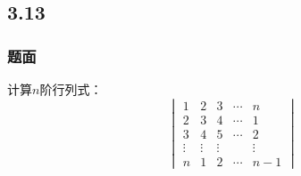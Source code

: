 \documentclass[10pt,xcolor=svgnames]{beamer} %
\begin{document}
\subsection*{3.13}
\begin{frame}
    \frametitle{题面}
    计算\(n\)阶行列式：
    \begin{equation*}
        \begin{vmatrix}
            1      & 2      & 3      & \cdots & n      \\
            2      & 3      & 4      & \cdots & 1      \\
            3      & 4      & 5      & \cdots & 2      \\
            \vdots & \vdots & \vdots &        & \vdots \\
            n      & 1      & 2      & \cdots & n-1
        \end{vmatrix}
    \end{equation*}
\end{frame}
\end{document}
